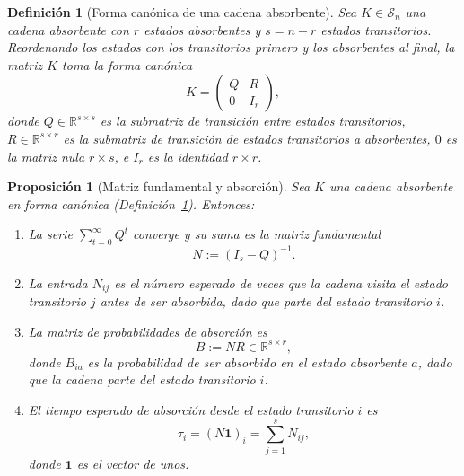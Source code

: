 ﻿\documentclass[12pt]{article}
\newtheorem{definicion}{Definición}[section]
\newtheorem{proposicion}{Proposición}[section]
\begin{document}
\begin{definicion}[Forma canónica de una cadena absorbente]\label{def:forma_canonica_absorbente}
Sea $K\in\mathcal{S}_n$ una cadena absorbente con $r$ estados absorbentes y $s=n-r$ estados transitorios. Reordenando los estados con los transitorios primero y los absorbentes al final, la matriz $K$ toma la \emph{forma canónica}
\[
K =
\begin{pmatrix}
Q & R \\
0 & I_r
\end{pmatrix},
\]
donde $Q\in\mathbb{R}^{s\times s}$ es la submatriz de transición entre estados transitorios, $R\in\mathbb{R}^{s\times r}$ es la submatriz de transición de estados transitorios a absorbentes, $0$ es la matriz nula $r\times s$, e $I_r$ es la identidad $r\times r$.
\end{definicion}

\begin{proposicion}[Matriz fundamental y absorción]\label{prop:matriz_fundamental}
Sea $K$ una cadena absorbente en forma canónica (Definición~\ref{def:forma_canonica_absorbente}). Entonces:
\begin{enumerate}[label=\textnormal{(\roman*)}]
    \item La serie $\sum_{t=0}^\infty Q^t$ converge y su suma es la \emph{matriz fundamental}
    \[
    N := (I_s - Q)^{-1}.
    \]
    \item La entrada $N_{ij}$ es el número esperado de veces que la cadena visita el estado transitorio $j$ antes de ser absorbida, dado que parte del estado transitorio $i$.
    \item La \emph{matriz de probabilidades de absorción} es
    \[
    B := NR \in \mathbb{R}^{s\times r},
    \]
    donde $B_{ia}$ es la probabilidad de ser absorbido en el estado absorbente $a$, dado que la cadena parte del estado transitorio $i$.
    \item El \emph{tiempo esperado de absorción} desde el estado transitorio $i$ es
    \[
    \tau_i = (N\mathbf{1})_i = \sum_{j=1}^s N_{ij},
    \]
    donde $\mathbf{1}$ es el vector de unos.
\end{enumerate}
\end{proposicion}
\end{document}

